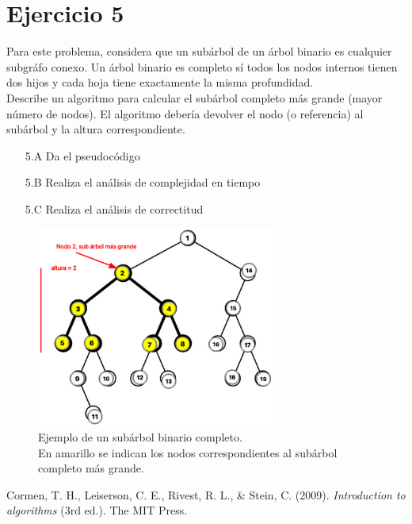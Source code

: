 \documentclass[12pt]{article}
\begin{document}
\section*{Ejercicio 5}
Para este problema, considera que un subárbol de un árbol binario es cualquier subgráfo conexo. Un árbol binario es completo sí todos los nodos internos tienen dos hijos y cada hoja tiene exactamente la misma profundidad.\\
Describe un algoritmo para calcular el subárbol completo más grande (mayor número de nodos). El algoritmo debería devolver el nodo (o referencia) al subárbol y la altura correspondiente.
\begin{itemize}
    \item[5.A] Da el pseudocódigo
    \item[5.B] Realiza el análisis de complejidad en tiempo
    \item[5.C] Realiza el análisis de correctitud
\end{itemize}
\begin{figure}[H]
    \centering
    \includegraphics[width=0.7\textwidth]{subárbol.png}
    \caption{Ejemplo de un subárbol binario completo.\\
    En amarillo se indican los nodos correspondientes al subárbol completo más grande.}
\end{figure}

\begin{thebibliography}{99}
    Cormen, T. H., Leiserson, C. E., Rivest, R. L., \& Stein, C. (2009). \textit{Introduction to algorithms} (3rd ed.). The MIT Press.
\end{thebibliography}
\end{document}
